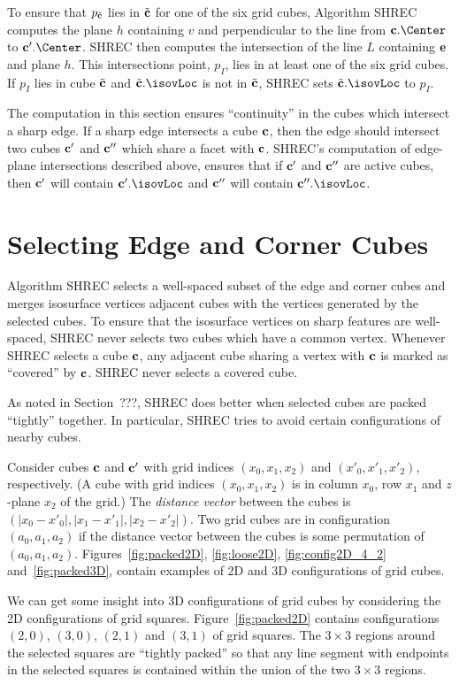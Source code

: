 To ensure that $p_{{\tilde{\mathbf{c}}}}$ lies in ${\tilde{\mathbf{c}}}$ for one of the six grid cubes,
Algorithm SHREC computes the plane $h$ containing $v$
and perpendicular to the line from $\cb.\Center$ to $\cb'.\Center$.
SHREC then computes the intersection of the line $L$ containing $\mathbf{e}$
and plane $h$.
This intersections point, $p_I$, lies in at least one of the six grid cubes.
If $p_I$ lies in cube ${\tilde{\mathbf{c}}}$ and $\tcb.\isovLoc$ is not in ${\tilde{\mathbf{c}}}$,
SHREC sets $\tcb.\isovLoc$ to $p_I$.

The computation in this section ensures ``continuity'' in the cubes
which intersect a sharp edge.
If a sharp edge intersects a cube $\mathbf{c}$,
then the edge should intersect two cubes $\mathbf{c}'$ and $\mathbf{c}''$
which share a facet with $\mathbf{c}$.
SHREC's computation of edge-plane intersections described above,
ensures that if $\mathbf{c}'$ and $\mathbf{c}''$ are active cubes,
then $\mathbf{c}'$ will contain $\cb'.\isovLoc$ and 
$\mathbf{c}''$ will contain $\cb''.\isovLoc$.


\section{Selecting Edge and Corner Cubes}
\label{section:selection}

Algorithm SHREC selects a well-spaced subset of the edge and corner cubes
and merges isosurface vertices adjacent cubes 
with the vertices generated by the selected cubes.
To ensure that the isosurface vertices on sharp features are well-spaced,
SHREC never selects two cubes which have a common vertex.
Whenever SHREC selects a cube $\mathbf{c}$,
any adjacent cube sharing a vertex with $\mathbf{c}$ is marked as ``covered''
by $\mathbf{c}$.
SHREC never selects a covered cube.

As noted in Section~???, 
SHREC does better when selected cubes 
are packed ``tightly'' together.
In particular, SHREC tries to avoid certain configurations of nearby cubes.

Consider cubes $\mathbf{c}$ and $\mathbf{c}'$ with grid indices $(x_0,x_1,x_2)$
and $(x'_0,x'_1,x'_2)$, respectively.
(A cube with grid indices $(x_0,x_1,x_2)$ is in column $x_0$, row $x_1$
and $z$-plane $x_2$ of the grid.)
The {\em distance vector} between the cubes is
$(|x_0-x'_0|, |x_1-x'_1|, |x_2-x'_2|)$.
Two grid cubes are in configuration $(a_0,a_1,a_2)$ if the distance vector
between the cubes is some permutation of $(a_0,a_1,a_2)$.
Figures~\ref{fig:packed2D}, \ref{fig:loose2D}, \ref{fig:config2D_4_2}
and~\ref{fig:packed3D},
contain examples of 2D and 3D configurations of grid cubes.

We can get some insight into 3D configurations of grid cubes
by considering the 2D configurations of grid squares.
Figure~\ref{fig:packed2D} contains configurations $(2,0)$, $(3,0)$,
$(2,1)$ and $(3,1)$ of grid squares.
The $3 \times 3$ regions around the selected squares are ``tightly packed''
so that any line segment with endpoints in the selected squares
is contained within the union of the two $3 \times 3$ regions.

